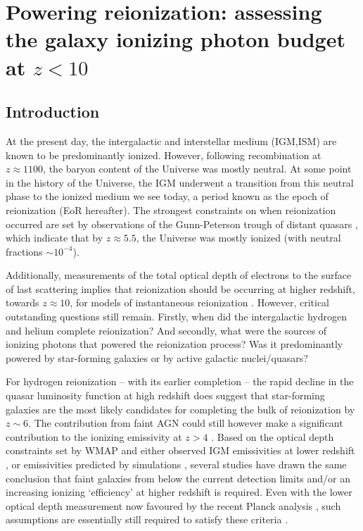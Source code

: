 \chapter[Powering reionization]{Powering reionization: assessing the galaxy ionizing photon budget at $z < 10$}\label{ch:reionization}

\section{Introduction}
At the present day, the intergalactic and interstellar medium (IGM,ISM) are known to be predominantly ionized. However, following recombination at $z\approx1100$, the baryon content of the Universe was mostly neutral. At some point in the history of the Universe, the IGM underwent a transition from this neutral phase to the ionized medium we see today, a period known as the epoch of reionization (EoR hereafter). The strongest constraints on when reionization occurred are set by observations of the Gunn-Peterson trough of distant quasars \citep{2006ARA&A..44..415F}, which indicate that by $z\approx 5.5$, the Universe was mostly ionized (with neutral fractions $\sim 10^{-4}$). 

Additionally, measurements of the total optical depth of electrons to the surface of last scattering implies that reionization should be occurring at higher redshift, towards $z \approx 10$, for models of instantaneous reionization \citep{Hinshaw:2013dd,Bennett:2013ew}. However, critical outstanding questions still remain. Firstly, when did the intergalactic hydrogen and helium complete reionization? And secondly, what were the sources of ionizing photons that powered the reionization process? Was it predominantly powered by star-forming galaxies or by active galactic nuclei/quasars?

For hydrogen reionization -- with its earlier completion -- the rapid decline in the quasar luminosity function at high redshift \citep{Willott:2010bk,Fontanot:2012fx,Fontanot:2014jz} does suggest that star-forming galaxies are the most likely candidates for completing the bulk of reionization by $z\sim6$. The contribution from faint AGN could still however make a significant contribution to the ionizing emissivity at $z>4$ \citep{2015A&A...578A..83G}. Based on the optical depth constraints set by WMAP \citep{Hinshaw:2013dd} and either observed IGM emissivities at lower redshift \citep{Kuhlen:2012ka,Robertson:2013ji,Becker:2013hc}, or emissivities predicted by simulations \citep{Ciardi:2012hl}, several studies have drawn the same conclusion that faint galaxies from below the current detection limits and/or an increasing ionizing `efficiency' at higher redshift is required. Even with the lower optical depth measurement now favoured by the recent Planck analysis \citep{2015arXiv150201589P}, such assumptions are essentially still required to satisfy these criteria \citep{2015ApJ...802L..19R}.

